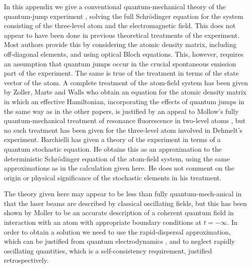 \documentclass[12pt,a4paper,reqno]{article}
\renewcommand{\(}{\left(}
\renewcommand{\)}{\right)}
\newcommand{\<}{\langle}
\renewcommand{\>}{\rangle}
\theoremstyle{plain} %
\theoremstyle{definition}
\theoremstyle{remark}
\begin{document}
In this appendix we give a conventional quantum-mechanical theory of the
quantum-jump experiment \cite{qjumps:expt1, qjumps:expt2, qjumps:expt3},
solving the full Schr\"odinger equation for the system consisting of the
three-level atom and the electromagnetic field. This does not appear to
have been done in previous theoretical treatments of the experiment.
Most authors \cite{Arecchi, Javanainen, Kimble, Nienhuis, Pegg,
Schenzle} provide this by considering the atomic density matrix, including
off-diagonal elements, and using optical Bloch equations. This, however,
requires an assumption that quantum jumps occur in the crucial
spontaneous emission part of the experiment. The same is true of the
treatment \cite{Cohen-T:qjumps} in terms of the state vector of the
atom. A complete treatment of the atom-field system has been given by
Zoller, Marte and Walls \cite{Zoller} who obtain an equation for the
atomic density matrix in which an effective Hamiltonian, incorporating
the effects of quantum jumps in the same way as in the other papers, is
justified by an appeal to Mollow's fully quantum-mechanical treatment of
resonance fluorescence in two-level atoms \cite{Mollow}, but no such
treatment has been given for the three-level atom involved in Dehmelt's
experiment. Barchielli \cite{Barchielli:qjumps} has given a theory of
the experiment in terms of a quantum stochastic equation. He obtains
this as an approximation to the deterministic Schr\"odinger equation of
the atom-field system, using the same approximations as in the
calculation given here. He does not comment on the origin or physical
significance of the stochastic elements in his treatment.

The theory given here may appear to be less than fully
quantum-mech-anical in that the laser beams are described by classical
oscillating fields, but this has been shown by Moller \cite{Mollow} to
be an accurate description of a coherent quantum field in interaction
with an atom with appropriate boundary conditions at $t=-\infty$. In
order to obtain a solution we need to use the rapid-dispersal
approximation, which can be justified from quantum electrodynamics
\cite{rapid-dispersal}, and to neglect rapidly oscillating quantities,
which is a self-consistency requirement, justified retrospectively. 
\end{document}
